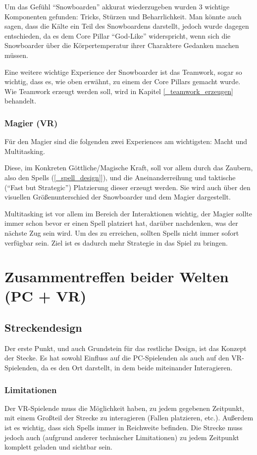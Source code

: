 Um das Gefühl "`Snowboarden"' akkurat wiederzugeben wurden 3 wichtige Komponenten gefunden: Tricks, Stürzen und Beharrlichkeit. Man könnte auch sagen, dass die Kälte ein Teil des Snowboardens darstellt, jedoch wurde dagegen entschieden, da es dem Core Pillar "`God-Like"' widerspricht, wenn sich die Snowboarder über die Körpertemperatur ihrer Charaktere Gedanken machen müssen.

Eine weitere wichtige Experience der Snowboarder ist das Teamwork, sogar so wichtig, dass es, wie oben erwähnt, zu einem der Core Pillars gemacht wurde. Wie Teamwork erzeugt werden soll, wird in Kapitel \ref{_teamwork_erzeugen} behandelt.

\subsubsection{Magier (VR)}
Für den Magier sind die folgenden zwei Experiences am wichtigsten: Macht und Multitasking. 

Diese, im Konkreten Göttliche/Magische Kraft, soll vor allem durch das Zaubern, also den Spells (\ref{_spell_design}]), und die Aneinanderreihung und taktische ("`Fast but Strategic"') Platzierung dieser erzeugt werden. Sie wird auch über den visuellen Größenunterschied der Snowboarder und dem Magier dargestellt.

Multitasking ist vor allem im Bereich der Interaktionen wichtig, der Magier sollte immer schon bevor er einen Spell platziert hat, darüber nachdenken, was der nächste Zug sein wird. Um des zu erreichen, sollten Spells nicht immer sofort verfügbar sein. Ziel ist es dadurch mehr Strategie in das Spiel zu bringen.

\section{Zusammentreffen beider Welten (PC + VR)}

\subsection{Streckendesign}
Der erste Punkt, und auch Grundstein für das restliche Design, ist das Konzept der Stecke. Es hat sowohl Einfluss auf die PC-Spielenden als auch auf den VR-Spielenden, da es den Ort darstellt, in dem beide miteinander Interagieren.

\subsubsection{Limitationen}
Der VR-Spielende muss die Möglichkeit haben, zu jedem gegebenen Zeitpunkt, mit einem Großteil der Strecke zu interagieren (Fallen platzieren, etc.). Außerdem ist es wichtig, dass sich Spells immer in Reichweite befinden. Die Strecke muss jedoch auch (aufgrund anderer technischer Limitationen) zu jedem Zeitpunkt komplett geladen und sichtbar sein.

